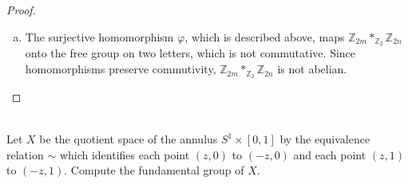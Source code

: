 \documentclass{article}
\newenvironment{problem}[2][Problem]{\begin{trivlist}
\item[\hskip \labelsep {\bfseries #1}\hskip \labelsep {\bfseries #2.}]}{\end{trivlist}}
\begin{document}
\begin{proof}
\begin{enumerate}[a.]
    \item The surjective homomorphism $\varphi$, which is described above, maps
    $\mathbb Z_{2m} *_{\mathbb Z_2} \mathbb Z_{2n}$ onto the free
    group on two letters, which is not commutative. Since homomorphisms preserve
    commutivity, $\mathbb Z_{2m} *_{\mathbb Z_2} \mathbb Z_{2n}$ is not abelian.
  \end{enumerate}
\end{proof}
\pagebreak
\begin{problem}{4} \text{} \\
  Let $X$ be the quotient space of the annulus $S^1 \times [0, 1]$ by the
  equivalence relation $\sim$ which identifies each point $(z, 0)$ to $(-z, 0)$ and
  each point $(z, 1)$ to $(-z, 1)$. Compute the fundamental group of $X$.
\end{problem}
\end{document}

